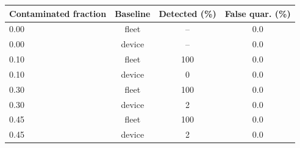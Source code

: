 \begin{tabular}{lccc}
\toprule
Contaminated fraction & Baseline & Detected (\%) & False quar. (\%) \\
\midrule
0.00 & fleet & -- & 0.0 \\
0.00 & device & -- & 0.0 \\
0.10 & fleet & 100 & 0.0 \\
0.10 & device & 0 & 0.0 \\
0.30 & fleet & 100 & 0.0 \\
0.30 & device & 2 & 0.0 \\
0.45 & fleet & 100 & 0.0 \\
0.45 & device & 2 & 0.0 \\
\bottomrule
\end{tabular}
